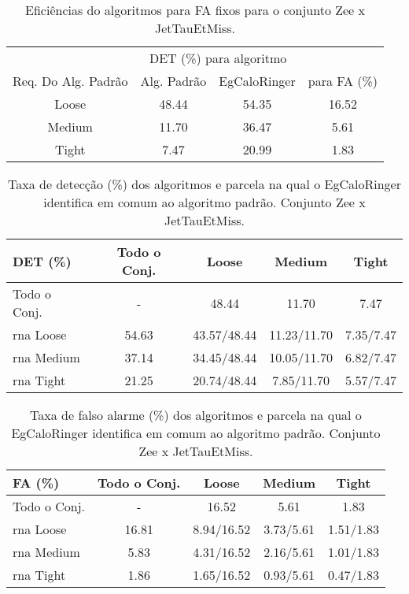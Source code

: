 \begin{table}[htb]
\centering
\begin{tabular}{cccc}
\hline
\hline
 & 
\multicolumn{2}{c}{DET (\%) para algoritmo} & 
\\
\cline{2-3}
\multirow{-2}{*}{Req. Do Alg. Padrão} & 
Alg. Padrão & 
EgCaloRinger & 
\multirow{-2}{*}{para FA (\%)} \\
\hline
Loose &  48.44 & 54.35 & 16.52 \\
Medium & 11.70 & 36.47 & 5.61 \\
Tight & 7.47 & 20.99 &  1.83 \\
\hline
\hline
\end{tabular}
\caption{Eficiências do algoritmos para FA fixos para o conjunto Zee x JetTauEtMiss.}
\label{tab:zeexjet_efic}
\end{table}

\begin{table}[htb]
\centering
\begin{tabular}{l cccc}
\hline
\hline
DET (\%)& Todo o Conj. & Loose & Medium & Tight \\
\hline
Todo o Conj.   &    - &  48.44 &  11.70 &  7.47  \\ 
\hline
\gls{rna} Loose & 54.63 & 43.57/48.44 & 11.23/11.70 & 7.35/7.47 \\
\hline
\gls{rna} Medium & 37.14 & 34.45/48.44 & 10.05/11.70 & 6.82/7.47 \\
\hline
\gls{rna} Tight &  21.25 & 20.74/48.44 & 7.85/11.70  & 5.57/7.47 \\
\hline
\hline
\end{tabular}
\caption{Taxa de detecção (\%) dos algoritmos e parcela na qual o EgCaloRinger
identifica em comum ao algoritmo padrão. Conjunto Zee x JetTauEtMiss.}
\label{tab:zeexjet_efic_det}
\end{table}

\begin{table}[htb]
\centering
\begin{tabular}{l cccc}
\hline
\hline
FA (\%)& Todo o Conj. & Loose & Medium & Tight \\
\hline
Todo o Conj.  &  - & 16.52 & 5.61 & 1.83 \\
\hline
\gls{rna} Loose  & 16.81 & 8.94/16.52 &  3.73/5.61 & 1.51/1.83 \\
\hline                                             
\gls{rna} Medium & 5.83  & 4.31/16.52 &  2.16/5.61 & 1.01/1.83 \\
\hline
\gls{rna} Tight  & 1.86  & 1.65/16.52 &  0.93/5.61 & 0.47/1.83 \\
\hline
\hline
\end{tabular}
\caption{Taxa de falso alarme (\%) dos algoritmos e parcela na qual o EgCaloRinger
identifica em comum ao algoritmo padrão. Conjunto Zee x JetTauEtMiss.}
\label{tab:zeexjet_fa_det}
\end{table}


